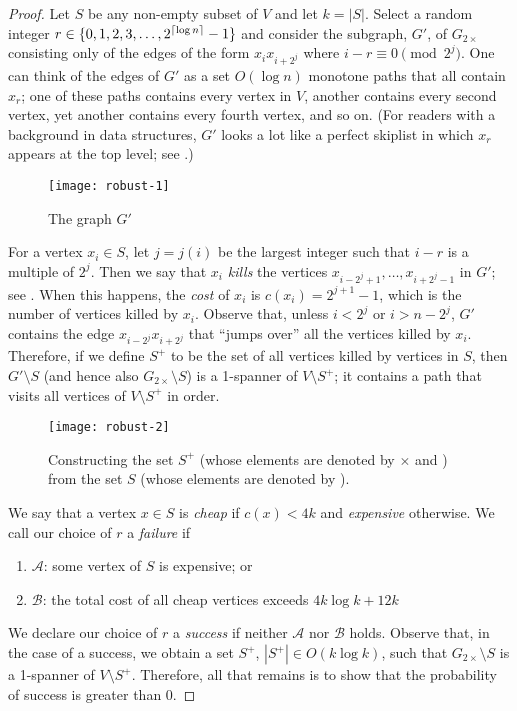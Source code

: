 \documentclass{patmorin}
\begin{document}
\begin{proof}
  Let $S$ be any non-empty subset of $V$ and let $k=|S|$.  Select a
  random integer $r\in\{0,1,2,3,\ldots,2^{{\lceil \log n \rceil}}-1\}$ and
  consider the subgraph, $G'$, of $G_{2\times}$ consisting only of
  the edges of the form $x_ix_{i+2^j}$ where $i-r\equiv 0\pmod{2^j}$.
  One can think of the edges of $G'$ as a set $O(\log n)$ monotone paths
  that all contain $x_r$; one of these paths contains every vertex in $V$,
  another contains every second vertex, yet another contains every fourth
  vertex, and so on.  (For readers with a background in data structures,
  $G'$ looks a lot like a perfect skiplist in which $x_r$
  appears at the top level; see .)

  \begin{figure}
    \begin{center}
      \texttt{[image: robust-1]}
    \end{center}
    \caption{The graph $G'$}
  \end{figure}

  For a vertex $x_i\in S$, let $j=j(i)$ be the largest integer such that
  $i-r$ is a multiple of $2^j$.  Then we say that $x_i$ \emph{kills}
  the vertices $x_{i-2^{j}+1},\ldots,x_{i+2^{j}-1}$ in $G'$; see
  .  When this happens, the \emph{cost} of $x_i$ is
  $c(x_i)=2^{j+1}-1$, which is the number of vertices killed by $x_i$.
  Observe that, unless $i<2^{j}$ or $i>n-2^{j}$, $G'$ contains the
  edge $x_{i-2^{j}}x_{i+2^{j}}$ that ``jumps over'' all the vertices
  killed by $x_i$.  Therefore, if we define $S^+$ to be the set of all
  vertices killed by vertices in $S$, then $G'\setminus S$ (and hence
  also $G_{2\times}\setminus S$) is a 1-spanner of $V\setminus S^+$; it
  contains a path that visits all vertices of $V\setminus S^+$ in order.
  
  \begin{figure}
    \begin{center}
      \texttt{[image: robust-2]}
    \end{center}
    \caption{Constructing the set $S^+$ (whose elements are denoted
    by $\times$ and \textbullet)
      from the set $S$ (whose elements are denoted by \textbullet).}
  \end{figure}
  
  We say that a vertex $x\in S$ is \emph{cheap} if $c(x) < 4k$ and
  \emph{expensive} otherwise.  We call our choice of $r$ a \emph{failure}
  if
  \begin{enumerate}
    \item $\mathcal{A}$: some vertex of $S$ is expensive; or
    \item $\mathcal{B}$: the total cost of all cheap vertices exceeds
      $4k\log k+12k$
  \end{enumerate}
  We declare our choice of $r$ a \emph{success} if neither
  $\mathcal{A}$ nor $\mathcal{B}$ holds.  Observe that, in the case
  of a success, we obtain a set $S^+$, $|S^+|\in O(k\log k)$, such that
  $G_{2\times}\setminus S$ is a 1-spanner of $V\setminus S^+$.  Therefore,
  all that remains is to show that the probability of success is greater
  than 0.
  

\end{proof}
\end{document}

